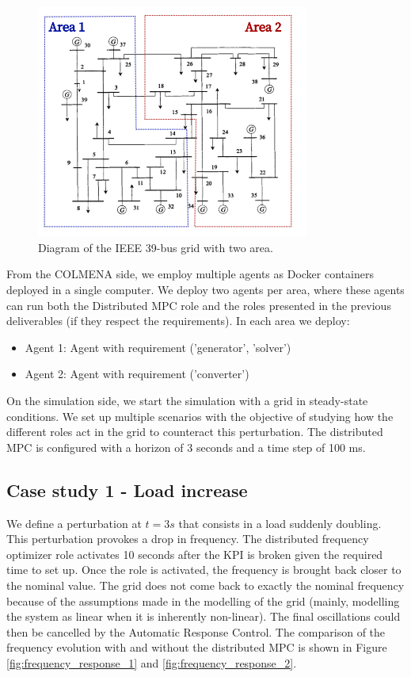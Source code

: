 \documentclass{article}
\begin{document}
\begin{figure}[ht]
    \centering
    \includegraphics[width=0.8\textwidth]{figures/ieee2areas.png}
    \caption{Diagram of the IEEE 39-bus grid with two area.}
    \label{fig:ieee39_2areas}
\end{figure}

From the COLMENA side, we employ multiple agents as Docker containers deployed in a single computer. We deploy two agents per area, where these agents can run both the Distributed MPC role and the roles presented in the previous deliverables (if they respect the requirements). In each area we deploy:

\begin{itemize}
    \item Agent 1: Agent with requirement ('generator', 'solver') 
    \item Agent 2: Agent with requirement ('converter') 
\end{itemize}

On the simulation side, we start the simulation with a grid in steady-state conditions. We set up multiple scenarios with the objective of studying how the different roles act in the grid to counteract this perturbation. The distributed MPC is configured with a horizon of 3 seconds and a time step of 100 ms.

\subsection{Case study 1 - Load increase}

We define a perturbation at $t=3s$ that consists in a load suddenly doubling. This perturbation provokes a drop in frequency. The distributed frequency optimizer role activates 10 seconds after the KPI is broken given the required time to set up. Once the role is activated, the frequency is brought back closer to the nominal value. The grid does not come back to exactly the nominal frequency because of the assumptions made in the modelling of the grid (mainly, modelling the system as linear when it is inherently non-linear). The final oscillations could then be cancelled by the Automatic Response Control. The comparison of the frequency evolution with and without the distributed MPC is shown in Figure \ref{fig:frequency_response_1} and \ref{fig:frequency_response_2}.
\end{document}
